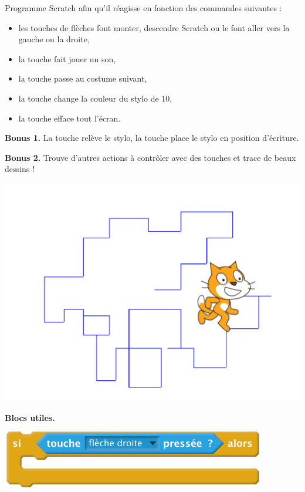 \documentclass[class=report,crop=false, 12pt]{standalone}
\begin{document}




\bigskip
\bigskip


\begin{activite}
Programme Scratch afin qu'il réagisse en fonction des commandes suivantes :
\begin{itemize}
  \item les touches de flèches font monter, descendre Scratch ou le font aller vers la gauche ou la droite,
  \item la touche  fait jouer un son,
  \item la touche  passe au costume suivant,
  \item la touche  change la couleur du stylo de $10$,
  \item la touche  efface tout l'écran.
\end{itemize}
\textbf{Bonus 1.} La touche  relève le stylo, la touche  place le stylo en position d'écriture.

\textbf{Bonus 2.} Trouve d'autres actions à contrôler avec des touches et trace de beaux dessins !

\begin{center}
  \includegraphics[scale=\scaleecran]{ecran-05-ex1} 
\end{center}



\textbf{Blocs utiles.}
\begin{center}
  \includegraphics[scale=\scalebloc]{bloc-05-ex1}
\end{center}

\end{activite}
\end{document}
